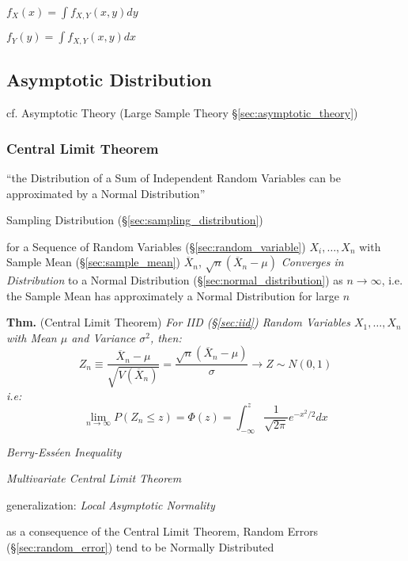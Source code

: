 $f_X(x) = \int f_{X,Y}(x,y) dy$

$f_Y(y) = \int f_{X,Y}(x,y) dx$



\subsection{Asymptotic Distribution}\label{sec:asymptotic_distribution}

\fist cf. Asymptotic Theory (Large Sample Theory \S\ref{sec:asymptotic_theory})



\subsubsection{Central Limit Theorem}\label{sec:central_limit}

``the Distribution of a Sum of Independent Random Variables can be approximated
by a Normal Distribution''

\fist Sampling Distribution (\S\ref{sec:sampling_distribution})

for a Sequence of Random Variables (\S\ref{sec:random_variable})
$X_i, \ldots, X_n$ with Sample Mean (\S\ref{sec:sample_mean})
$\overline{X}_n$, $\sqrt{n}(\overline{X}_n - \mu)$
\emph{Converges in Distribution} to a Normal Distribution
(\S\ref{sec:normal_distribution}) as $n \rightarrow \infty$, i.e. the Sample
Mean has approximately a Normal Distribution for large $n$

\textbf{Thm.} (Central Limit Theorem) \emph{For IID (\S\ref{sec:iid}) Random
  Variables $X_1, \ldots, X_n$ with Mean $\mu$ and Variance $\sigma^2$, then:
  \[
    Z_n \equiv \frac{\overline{X}_n - \mu}{\sqrt{V(\overline{X}_n)}} =
      \frac{\sqrt{n}(\overline{X}_n - \mu)}{\sigma} \rightarrow Z \sim N(0,1)
  \]
  i.e:
  \[
    \lim_{n\rightarrow\infty} P(Z_n \leq z) = \Phi(z) =
      \int_{-\infty}^z \frac{1}{\sqrt{2\pi}}e^{-x^2/2} dx
  \]
}

\emph{Berry-Ess\'een Inequality}

\emph{Multivariate Central Limit Theorem}

generalization: \emph{Local Asymptotic Normality}

as a consequence of the Central Limit Theorem, Random Errors
(\S\ref{sec:random_error}) tend to be Normally Distributed


